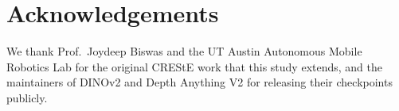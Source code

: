 \documentclass[conference]{IEEEtran}
\begin{document}
\section*{Acknowledgements}

We thank Prof.\ Joydeep Biswas and the UT Austin Autonomous Mobile Robotics
Lab for the original CREStE work that this study extends, and the
maintainers of DINOv2 and Depth Anything V2 for releasing their checkpoints
publicly.



\end{document}
